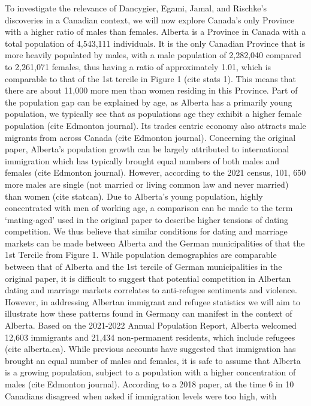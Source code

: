 \documentclass[
]{article}
\begin{document}
To investigate the relevance of Dancygier, Egami, Jamal, and Rischke's
discoveries in a Canadian context, we will now explore Canada's only
Province with a higher ratio of males than females. Alberta is a
Province in Canada with a total population of 4,543,111 individuals. It
is the only Canadian Province that is more heavily populated by males,
with a male population of 2,282,040 compared to 2,261,071 females, thus
having a ratio of approximately 1.01, which is comparable to that of the
1st tercile in Figure 1 (cite stats 1). This means that there are about
11,000 more men than women residing in this Province. Part of the
population gap can be explained by age, as Alberta has a primarily young
population, we typically see that as populations age they exhibit a
higher female population (cite Edmonton journal). Its trades centric
economy also attracts male migrants from across Canada (cite Edmonton
journal). Concerning the original paper, Alberta's population growth can
be largely attributed to international immigration which has typically
brought equal numbers of both males and females (cite Edmonton journal).
However, according to the 2021 census, 101, 650 more males are single
(not married or living common law and never married) than women (cite
statcan). Due to Alberta's young population, highly concentrated with
men of working age, a comparison can be made to the term `mating-aged'
used in the original paper to describe higher tensions of dating
competition. We thus believe that similar conditions for dating and
marriage markets can be made between Alberta and the German
municipalities of that the 1st Tercile from Figure 1. While population
demographics are comparable between that of Alberta and the 1st tercile
of German municipalities in the original paper, it is difficult to
suggest that potential competition in Albertan dating and marriage
markets correlates to anti-refugee sentiments and violence. However, in
addressing Albertan immigrant and refugee statistics we will aim to
illustrate how these patterns found in Germany can manifest in the
context of Alberta. Based on the 2021-2022 Annual Population Report,
Alberta welcomed 12,603 immigrants and 21,434 non-permanent residents,
which include refugees (cite alberta.ca). While previous accounts have
suggested that immigration has brought an equal number of males and
females, it is safe to assume that Alberta is a growing population,
subject to a population with a higher concentration of males (cite
Edmonton journal). According to a 2018 paper, at the time 6 in 10
Canadians disagreed when asked if immigration levels were too high, with
\end{document}
